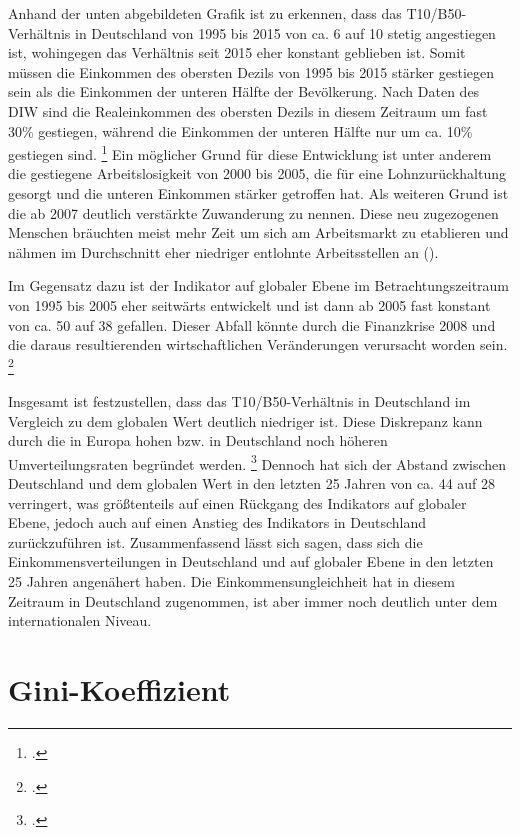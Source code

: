 Anhand der unten abgebildeten Grafik ist zu erkennen, dass das T10/B50-Verhältnis in Deutschland von 1995 bis 2015 von ca. 6 auf 10 stetig angestiegen ist, wohingegen das Verhältnis seit 2015 eher konstant geblieben ist. Somit müssen die Einkommen des obersten Dezils von 1995 bis 2015 stärker gestiegen sein als die Einkommen der unteren Hälfte der Bevölkerung. Nach Daten des DIW sind die Realeinkommen des obersten Dezils in diesem Zeitraum um fast 30\% gestiegen, während die Einkommen der unteren Hälfte nur um ca. 10\% gestiegen sind. \footcite[Vgl.][S. 452]{grabka_einkommensverteilung_2018} Ein möglicher Grund für diese Entwicklung ist unter anderem die gestiegene Arbeitslosigkeit von 2000 bis 2005, die für eine Lohnzurückhaltung gesorgt und die unteren Einkommen stärker getroffen hat. Als weiteren Grund ist die ab 2007 deutlich verstärkte Zuwanderung zu nennen. Diese neu zugezogenen Menschen bräuchten meist mehr Zeit um sich am Arbeitsmarkt zu etablieren und nähmen im Durchschnitt eher niedriger entlohnte Arbeitsstellen an (\cite[Vgl.][S.453]{grabka_einkommensverteilung_2018}). 

Im Gegensatz dazu ist der Indikator auf globaler Ebene im Betrachtungszeitraum von 1995 bis 2005 eher seitwärts entwickelt und ist dann ab 2005 fast konstant von ca. 50 auf 38 gefallen. Dieser Abfall könnte durch die Finanzkrise 2008 und die daraus resultierenden wirtschaftlichen Veränderungen verursacht worden sein. \footcite[Vgl.][S. 55]{wir_2022}

Insgesamt ist festzustellen, dass das T10/B50-Verhältnis in Deutschland im Vergleich zu dem globalen Wert deutlich niedriger ist. Diese Diskrepanz kann durch die in Europa hohen bzw. in Deutschland noch höheren Umverteilungsraten begründet werden. \footcite[Vgl.][S. 36f]{wir_2022} Dennoch hat sich der Abstand zwischen Deutschland und dem globalen Wert in den letzten 25 Jahren von ca. 44 auf 28 verringert, was grö{\ss}tenteils auf einen Rückgang des Indikators auf globaler Ebene, jedoch auch auf einen Anstieg des Indikators in Deutschland zurückzuführen ist. Zusammenfassend lässt sich sagen, dass sich die Einkommensverteilungen in Deutschland und auf globaler Ebene in den letzten 25 Jahren angenähert haben. Die Einkommensungleichheit hat in diesem Zeitraum in Deutschland zugenommen, ist aber immer noch deutlich unter dem internationalen Niveau.

\section{Gini-Koeffizient}

